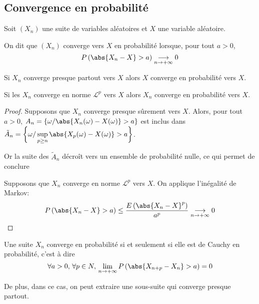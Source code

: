 \subsection{Convergence en probabilité}

\begin{de}
Soit $(X_n)$ une suite de variables aléatoires et $X$ une variable aléatoire.

On dit que $(X_n)$ converge vers $X$ en probabilité lorsque, pour tout $a>0$, 
\[
P\left( \abs{X_n -X}>a \right) \underset{n \to +\infty}{\longrightarrow} 0
\]

\end{de}


\begin{prop}
Si $X_n$ converge presque partout vers $X$ alors $X$ converge en probabilité vers $X$.

Si les $X_n$ converge en norme $\mathcal{L}^p$ vers $X$ alors $X_n$ converge en probabilité vers $X$.
\end{prop}

\begin{proof}
Supposons que $X_n$ converge presque sûrement vers $X$. Alors, pour tout $a>0$, $A_n = \left \{ \omega/ \abs{X_n(\omega)-X(\omega)} > a \right \}$ est inclus dans $\tilde{A}_n = \left \{ \omega/ \sup \limits_{p \geq n} \abs{X_p(\omega)-X(\omega)} > a\right \}$. 

Or la suite des $\tilde{A}_n$ décroît vers un ensemble de probabilité nulle, ce qui permet de conclure

Supposons que $X_n$ converge en norme $\mathcal{L}^p$ vers $X$. On applique l'inégalité de Markov:
\[
P\left(\abs{X_n-X}>a\right) \leq \dfrac{E\left(\abs{X_n-X}^p\right)}{a^p} \underset{n \to +\infty}{\longrightarrow} 0
\]
\end{proof}

\begin{prop}
Une suite $X_n$ converge en probabilité si et seulement si elle est de Cauchy en probabilité, c'est à dire
\[
\forall a>0, \, \forall p \in N, \, \lim \limits_{n \to +\infty} P\left(\abs{X_{n+p}-X_n}>a\right) = 0
\]

De plus, dans ce cas, on peut extraire une sous-suite qui converge presque partout.
\end{prop}

